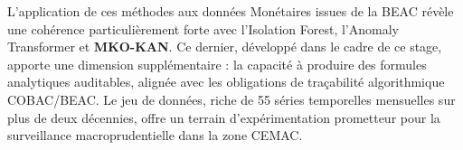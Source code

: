 \documentclass[12pt, a4paper]{article}
\begin{document}
L'application de ces méthodes aux données Monétaires issues
de la BEAC révèle une cohérence particulièrement forte avec l'Isolation
Forest, l'Anomaly Transformer et \textbf{MKO-KAN}. Ce dernier, développé
dans le cadre de ce stage, apporte une dimension supplémentaire : la
capacité à produire des formules analytiques auditables, alignée avec
les obligations de traçabilité algorithmique COBAC/BEAC. Le jeu de données,
riche de 55 séries temporelles mensuelles sur plus de deux décennies,
offre un terrain d'expérimentation prometteur pour la surveillance
macroprudentielle dans la zone CEMAC.



\end{document}
